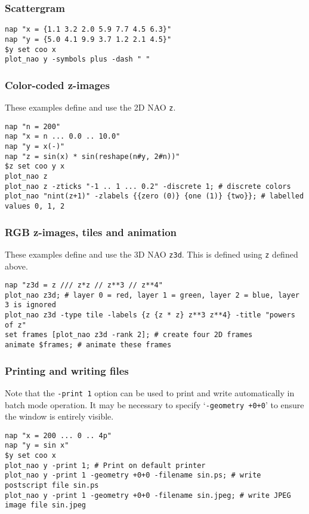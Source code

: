 \subsubsection{Scattergram}
    \label{plot-nao-scattergram}

  \begin{verbatim}
nap "x = {1.1 3.2 2.0 5.9 7.7 4.5 6.3}"
nap "y = {5.0 4.1 9.9 3.7 1.2 2.1 4.5}"
$y set coo x
plot_nao y -symbols plus -dash " "
\end{verbatim}

\subsubsection{Color-coded z-images}
    \label{plot-nao-z2}

These examples define and use the 2D NAO 
  \texttt{z}.
  \begin{verbatim}
nap "n = 200"
nap "x = n ... 0.0 .. 10.0"
nap "y = x(-)"
nap "z = sin(x) * sin(reshape(n#y, 2#n))"
$z set coo y x
plot_nao z
plot_nao z -zticks "-1 .. 1 ... 0.2" -discrete 1; # discrete colors
plot_nao "nint(z+1)" -zlabels {{zero (0)} {one (1)} {two}}; # labelled values 0, 1, 2
\end{verbatim}

\subsubsection{RGB z-images, tiles and animation}
    \label{plot-nao-z3}

These examples define and use the 3D NAO 
  \texttt{z3d}. This is defined using 
  \texttt{z} defined above.
  \begin{verbatim}
nap "z3d = z /// z*z // z**3 // z**4"
plot_nao z3d; # layer 0 = red, layer 1 = green, layer 2 = blue, layer 3 is ignored
plot_nao z3d -type tile -labels {z {z * z} z**3 z**4} -title "powers of z"
set frames [plot_nao z3d -rank 2]; # create four 2D frames
animate $frames; # animate these frames
\end{verbatim}

\subsubsection{Printing and writing files}
    \label{plot-nao-print}

Note that the 
  \texttt{-print\ 1} option can be used to print and write
  automatically in batch mode operation. It may be necessary to specify
  `\texttt{-geometry\ +0+0}' to ensure the window is
  entirely visible.
  \begin{verbatim}
nap "x = 200 ... 0 .. 4p"
nap "y = sin x"
$y set coo x
plot_nao y -print 1; # Print on default printer
plot_nao y -print 1 -geometry +0+0 -filename sin.ps; # write postscript file sin.ps
plot_nao y -print 1 -geometry +0+0 -filename sin.jpeg; # write JPEG image file sin.jpeg
\end{verbatim}

